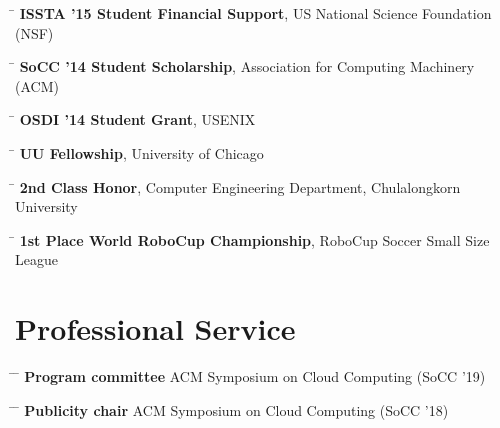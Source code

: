 \documentclass[10pt]{article} %
\begin{document}
\begin{tabbing}
\hspace{2.5cm} \=  \> \textbf{ISSTA '15 Student Financial Support}, US National Science Foundation (NSF)
\end{tabbing}

\begin{tabbing}
\hspace{2.5cm} \=  \> \textbf{SoCC '14 Student Scholarship}, Association for Computing Machinery (ACM)
\end{tabbing}

\begin{tabbing}
\hspace{2.5cm} \=  \> \textbf{OSDI '14 Student Grant}, USENIX
\end{tabbing}

\begin{tabbing}
\hspace{2.5cm} \=  \> \textbf{UU Fellowship}, University of Chicago
\end{tabbing}

\begin{tabbing}
\hspace{2.5cm} \=  \> \textbf{2nd Class Honor}, Computer Engineering Department, Chulalongkorn University
\end{tabbing}

\begin{tabbing}
\hspace{2.5cm} \=  \> \textbf{1st Place World RoboCup Championship}, RoboCup Soccer Small Size League
\end{tabbing}


\section{Professional Service}

\begin{tabbing}
\hspace{2.5cm} \= \hspace{4.5cm}  \=  \> \textbf{Program committee} \> ACM Symposium on Cloud Computing (SoCC '19)
\end{tabbing}

\begin{tabbing}
\hspace{2.5cm} \= \hspace{4.5cm}  \=  \> \textbf{Publicity chair} \> ACM Symposium on Cloud Computing (SoCC '18)
\end{tabbing}
\end{document}
